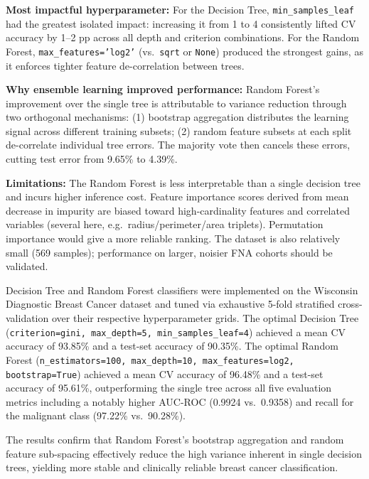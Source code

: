 \documentclass[12pt,a4paper]{article}
\begin{document}
\textbf{Most impactful hyperparameter:}
For the Decision Tree, \texttt{min\_samples\_leaf} had the greatest isolated impact: increasing
it from 1 to 4 consistently lifted CV accuracy by 1--2 pp across all depth and criterion
combinations. For the Random Forest, \texttt{max\_features='log2'} (vs.\ \texttt{sqrt} or
\texttt{None}) produced the strongest gains, as it enforces tighter feature de-correlation between
trees.

\textbf{Why ensemble learning improved performance:}
Random Forest's improvement over the single tree is attributable to variance reduction through
two orthogonal mechanisms: (1) bootstrap aggregation distributes the learning signal across
different training subsets; (2) random feature subsets at each split de-correlate individual tree
errors. The majority vote then cancels these errors, cutting test error from 9.65\% to 4.39\%.

\textbf{Limitations:}
The Random Forest is less interpretable than a single decision tree and incurs higher inference
cost. Feature importance scores derived from mean decrease in impurity are biased toward
high-cardinality features and correlated variables (several here, e.g.\ radius/perimeter/area
triplets). Permutation importance would give a more reliable ranking. The dataset is also
relatively small (569 samples); performance on larger, noisier FNA cohorts should be validated.

Decision Tree and Random Forest classifiers were implemented on the Wisconsin Diagnostic Breast
Cancer dataset and tuned via exhaustive 5-fold stratified cross-validation over their respective
hyperparameter grids. The optimal Decision Tree (\texttt{criterion=gini, max\_depth=5,
min\_samples\_leaf=4}) achieved a mean CV accuracy of 93.85\% and a test-set accuracy of 90.35\%.
The optimal Random Forest (\texttt{n\_estimators=100, max\_depth=10, max\_features=log2,
bootstrap=True}) achieved a mean CV accuracy of 96.48\% and a test-set accuracy of 95.61\%,
outperforming the single tree across all five evaluation metrics including a notably higher
AUC-ROC (0.9924 vs.\ 0.9358) and recall for the malignant class (97.22\% vs.\ 90.28\%).

The results confirm that Random Forest's bootstrap aggregation and random feature sub-spacing
effectively reduce the high variance inherent in single decision trees, yielding more stable
and clinically reliable breast cancer classification.

\end{document}
